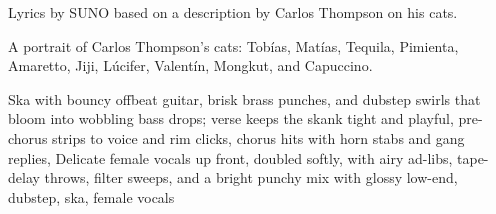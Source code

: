 
\begin{notes}
Lyrics by SUNO based on a description by Carlos Thompson on his cats.

A portrait of Carlos Thompson's cats: Tobías, Matías, Tequila, Pimienta, Amaretto, Jiji, Lúcifer, Valentín, Mongkut, and Capuccino.
\end{notes}
\begin{style}
Ska with bouncy offbeat guitar, brisk brass punches, and dubstep swirls that bloom into wobbling bass drops; verse keeps the skank tight and playful, pre-chorus strips to voice and rim clicks, chorus hits with horn stabs and gang replies, Delicate female vocals up front, doubled softly, with airy ad-libs, tape-delay throws, filter sweeps, and a bright punchy mix with glossy low-end, dubstep, ska, female vocals
\end{style}
